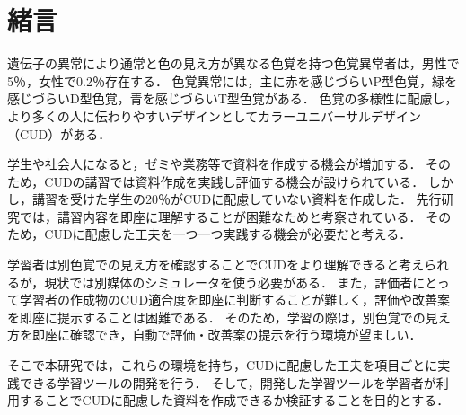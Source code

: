 \section{緒言}

遺伝子の異常により通常と色の見え方が異なる色覚を持つ色覚異常者は，男性で5％，女性で0.2％存在する\cite{okabe}．
色覚異常には，主に赤を感じづらいP型色覚，緑を感じづらいD型色覚，青を感じづらいT型色覚がある．
色覚の多様性に配慮し，より多くの人に伝わりやすいデザインとしてカラーユニバーサルデザイン（CUD）がある．

学生や社会人になると，ゼミや業務等で資料を作成する機会が増加する．
そのため，CUDの講習では資料作成を実践し評価する機会が設けられている．
しかし，講習を受けた学生の20％がCUDに配慮していない資料を作成した\cite{sugamiya}．
先行研究では，講習内容を即座に理解することが困難なためと考察されている．
そのため，CUDに配慮した工夫を一つ一つ実践する機会が必要だと考える．

学習者は別色覚での見え方を確認することでCUDをより理解できると考えられるが，現状では別媒体のシミュレータを使う必要がある．
また，評価者にとって学習者の作成物のCUD適合度を即座に判断することが難しく，評価や改善案を即座に提示することは困難である．
そのため，学習の際は，別色覚での見え方を即座に確認でき，自動で評価・改善案の提示を行う環境が望ましい．

そこで本研究では，これらの環境を持ち，CUDに配慮した工夫を項目ごとに実践できる学習ツールの開発を行う．
そして，開発した学習ツールを学習者が利用することでCUDに配慮した資料を作成できるか検証することを目的とする．

